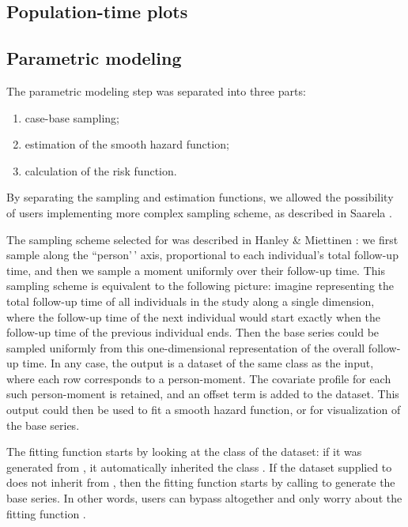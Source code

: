 \documentclass[
]{jss}
\providecommand{\tightlist}{%
  \setlength{\itemsep}{0pt}\setlength{\parskip}{0pt}}
\begin{document}
\hypertarget{population-time-plots}{%
\subsection{Population-time plots}\label{population-time-plots}}

\hypertarget{parametric-modeling}{%
\subsection{Parametric modeling}\label{parametric-modeling}}

The parametric modeling step was separated into three parts:

\begin{enumerate}
\def\labelenumi{\arabic{enumi}.}
\tightlist
\item
  case-base sampling;
\item
  estimation of the smooth hazard function;
\item
  calculation of the risk function.
\end{enumerate}

By separating the sampling and estimation functions, we allowed the
possibility of users implementing more complex sampling scheme, as
described in Saarela \citeyearpar{saarela2016case}.

The sampling scheme selected for  was described in
Hanley \& Miettinen \citeyearpar{hanley2009fitting}: we first sample
along the ``person'\,' axis, proportional to each individual's total
follow-up time, and then we sample a moment uniformly over their
follow-up time. This sampling scheme is equivalent to the following
picture: imagine representing the total follow-up time of all
individuals in the study along a single dimension, where the follow-up
time of the next individual would start exactly when the follow-up time
of the previous individual ends. Then the base series could be sampled
uniformly from this one-dimensional representation of the overall
follow-up time. In any case, the output is a dataset of the same class
as the input, where each row corresponds to a person-moment. The
covariate profile for each such person-moment is retained, and an offset
term is added to the dataset. This output could then be used to fit a
smooth hazard function, or for visualization of the base series.

The fitting function  starts by looking at the
class of the dataset: if it was generated from , it
automatically inherited the class . If the dataset supplied
to  does not inherit from , then the
fitting function starts by calling  to generate the
base series. In other words, users can bypass 
altogether and only worry about the fitting function
.
\end{document}
